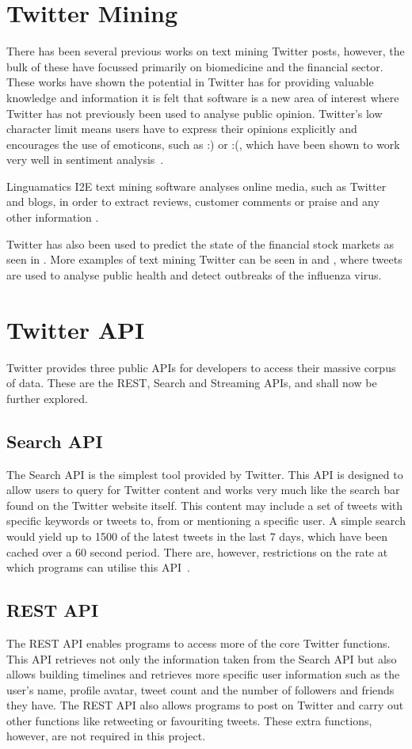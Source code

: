 \section{Twitter Mining}
There has been several previous works on text mining Twitter posts, however, the bulk of these have focussed primarily on biomedicine and the financial sector. These works have shown the potential in Twitter has for providing valuable knowledge and information it is felt that software is a new area of interest where Twitter has not previously been used to analyse public opinion. Twitter's low character limit means users have to express their opinions explicitly and encourages the use of emoticons, such as :) or :(, which have been shown to work very well in sentiment analysis~\cite{Read:2005}.

Linguamatics I2E text mining software analyses online media, such as Twitter and blogs, in order to extract reviews, customer comments or praise and any other information \cite{linguamatics}.

Twitter has also been used to predict the state of the financial stock markets as seen in \cite{Bollen11}. More examples of text mining Twitter can be seen in \cite{PaulD11} and \cite{culotta10}, where tweets are used to analyse public health and detect outbreaks of the influenza virus. 

\section{Twitter API}
Twitter provides three public APIs for developers to access their massive corpus of data. These are the REST, Search and Streaming APIs, and shall now be further explored.

\subsection{Search API}
The Search API is the simplest tool provided by Twitter. This API is designed to allow users to query for Twitter content and works very much like the search bar found on the Twitter website itself. This content may include a set of tweets with specific keywords or tweets to, from or mentioning a specific user. A simple search would yield up to 1500 of the latest tweets in the last 7 days, which have been cached over a 60 second period. There are, however, restrictions on the rate at which programs can utilise this API~\cite{twitter}.

\subsection{REST API}
The REST API enables programs to access more of the core Twitter functions. This API retrieves not only the information taken from the Search API but also allows building timelines and retrieves more specific user information such as the user's name, profile avatar, tweet count and the number of followers and friends they have. The REST API also allows programs to post on Twitter and carry out other functions like retweeting or favouriting tweets. These extra functions, however, are not required in this project.

